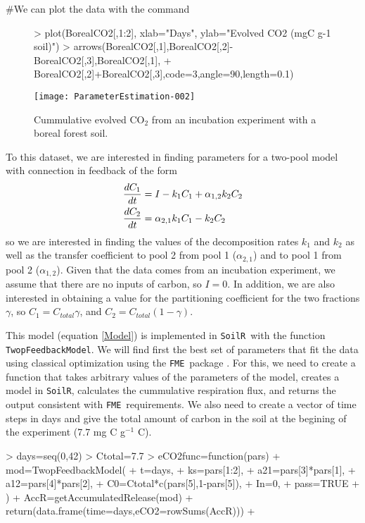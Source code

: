 \documentclass[a4paper]{article}
\newcommand{\SoilR}{\texttt{SoilR}}
\newcommand{\FME}{\texttt{FME}}
\begin{document}
#We can plot the data with the command

\begin{figure}
  \centering
\begin{Schunk}
\begin{Sinput}
> plot(BorealCO2[,1:2], xlab="Days", ylab="Evolved CO2 (mgC g-1 soil)")
> arrows(BorealCO2[,1],BorealCO2[,2]-BorealCO2[,3],BorealCO2[,1],
+        BorealCO2[,2]+BorealCO2[,3],code=3,angle=90,length=0.1)
\end{Sinput}
\end{Schunk}
\texttt{[image: ParameterEstimation-002]}
  \caption{Cummulative evolved CO$_2$ from an incubation experiment with a boreal forest soil.}
  \label{fig:eCO2}
\end{figure}

To this dataset, we are interested in finding parameters for a two-pool model with connection in feedback of the form \citep{SierraGMD}
\begin{align} \label{Model}
\frac{dC_1}{dt} &= I - k_1 C_1 + \alpha_{1,2} k_2 C_2 \notag \\
\frac{dC_2}{dt} &= \alpha_{2,1} k_1 C_1 - k_2 C_2
\end{align}
so we are interested in finding the values of the decomposition rates $k_1$ and $k_2$ as well as the transfer coefficient to pool 2 from pool 1 ($\alpha_{2,1}$) and to pool 1 from pool 2 ($\alpha_{1,2}$). Given that the data comes from an incubation experiment, we assume that there are no inputs of carbon, so $I=0$. In addition, we are also interested in obtaining a value for the partitioning coefficient for the two fractions $\gamma$, so $C_1 = C_{total} \gamma$, and $C_2 = C_{total} (1- \gamma)$. 

This model (equation \ref{Model}) is implemented in \SoilR \, with the function {\tt TwopFeedbackModel}. We will find first the best set of parameters that fit the data using classical optimization using the \FME \, package \citep{Soetaert}. For this, we need to create a function that takes arbitrary values of the parameters of the model, creates a model in \SoilR, calculates the cummulative respiration flux, and returns the output consistent with \FME \, requirements. We also need to create a vector of time steps in days and give the total amount of carbon in the soil at the begining of the experiment (7.7 mg C g$^{-1}$ C). 

\begin{Schunk}
\begin{Sinput}
> days=seq(0,42)
> Ctotal=7.7
> eCO2func=function(pars){
+   mod=TwopFeedbackModel(
+   t=days,
+   ks=pars[1:2],
+   a21=pars[3]*pars[1],
+   a12=pars[4]*pars[2], 
+   C0=Ctotal*c(pars[5],1-pars[5]), 
+   In=0,
+   pass=TRUE
+   )
+   AccR=getAccumulatedRelease(mod)
+   return(data.frame(time=days,eCO2=rowSums(AccR)))
+ }
\end{Sinput}
\end{Schunk}
\end{document}
